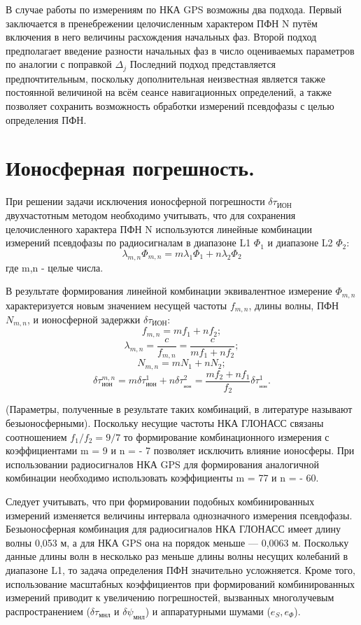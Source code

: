 \documentclass[14pt,a4paper,oneside]{extarticle}
\begin{document}
В случае работы по измерениям по НКА GPS возможны два подхода. Первый заключается в пренебрежении целочисленным характером ПФН N путём включения в него величины расхождения начальных фаз. Второй подход предполагает введение разности начальных фаз в число оцениваемых параметров по аналогии с поправкой $\Delta_j$ Последний подход представляется предпочтительным, поскольку дополнительная неизвестная является также постоянной величиной на всём сеансе навигационных определений, а также позволяет сохранить возможность обработки измерений псевдофазы с целью определения ПФН.

\section{Ионосферная погрешность.}

При решении задачи исключения ионосферной погрешности $\delta\tau_\text{ИОН}$ двухчастотным методом необходимо учитывать, что для сохранения целочисленного характера ПФН N используются линейные комбинации измерений псевдофазы по радиосигналам в диапазоне L1 $\Phi_1$ и диапазоне L2 $\Phi_2$: \[\lambda_{m,n}\Phi_{m,n}=m\lambda_{1}\Phi_{1}+n\lambda_{2}\Phi_{2}\] где m,n - целые числа.

В результате формирования линейной комбинации эквивалентное  измерение $\Phi_{m,n}$ характеризуется новым значением несущей частоты $f_{m,n}$, длины волны, ПФН $N_{m,n}$, и ионосферной задержки $\delta\tau_\text{ИОН}$:
\[f_{m,n}=mf_1+nf_2;\]
\[\lambda_{m,n}=\frac{c}{f_{m,n}}=\frac{c}{mf_{1}+nf_{2}};\]
\[N_{m,n}=mN_{1}+nN_{2};\]
\[{\delta}\tau_{\text{ион}}^{m,n}=m{\delta}\tau_{\text{ион}}^{1}+n{\delta}\tau_{_{\text{ион}}}^{2}=\frac{mf_{2}+nf_{1}}{f_{2}}{\delta}\tau_{_{\text{ион}}}^{1}.\]

(Параметры, полученные в результате таких комбинаций, в литературе называют безыоносферными). Поскольку несущие частоты НКА ГЛОНАСС связаны соотношением $f_1/f_2 = 9/7$ то формирование комбинационного
измерения с коэффициентами m = 9 и n = - 7 позволяет исключить влияние ионосферы. При использовании радиосигналов НКА GPS для формирования аналогичной комбинации необходимо использовать коэффициенты m = 77 и n = - 60.

Следует учитывать, что при формировании подобных комбинированных измерений изменяется величины интервала однозначного измерения псевдофазы. Безыоносферная комбинация для радиосигналов НКА ГЛОНАСС имеет длину волны 0,053 м, а для НКА GPS она на порядок меньше –– 0,0063 м. Поскольку данные длины волн в несколько раз меньше длины волны несущих колебаний в диапазоне L1, то задача определения ПФН значительно усложняется. Кроме того, использование масштабных коэффициентов при формирований комбинированных измерений приводит к увеличению погрешностей, вызванных многолучевым распространением ($\delta\tau_\text{мнл}$ и $\delta\psi_\text{мнл}$) и аппаратурными шумами ($e_S,e_\Phi$).
\end{document}
